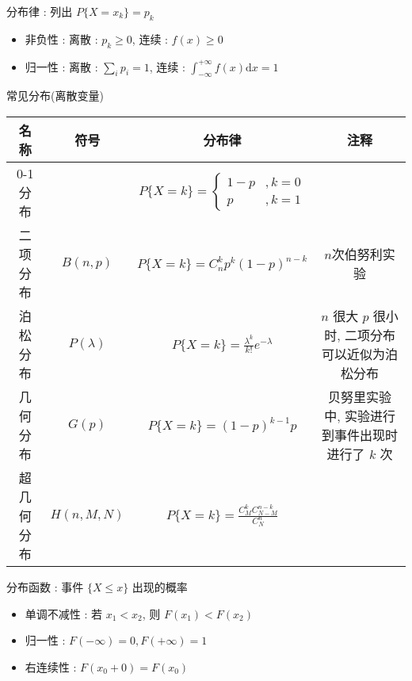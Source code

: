 \documentclass[UTF8, 12pt]{ctexart}
\begin{document}
	分布律 : 列出 $ P\{X = x_{k}\} = p_{k} $
	\begin{itemize}[leftmargin = 4em]
		\item 非负性 : 离散 : $ p_{k} \geq 0 $, 连续 : $ f(x) \geq 0 $
		\item 归一性 : 离散 : $ \sum\limits_{i}p_i = 1 $, 连续 : $ \int_{-\infty}^{+\infty}f(x)\mathrm{d}x = 1 $
	\end{itemize}

	常见分布(离散变量)
	\begin{table}[ht]
		\begin{tabular}{|c|c|c|c|}
			\hline
			名称 & 符号 & 分布律 & 注释 \\ \hline
			0-1分布 & & $ P\{X = k\} = \begin{cases} 1-p&, k=0 \\ p&, k=1 \end{cases} $ & \\ \hline
			二项分布 & $ B(n, p) $ & $ P\{X = k\} = C_{n}^{k}p^{k}(1-p)^{n-k} $ & $ n $次伯努利实验  \\ \hline
			泊松分布 & $ P(\lambda) $ & $ P\{X = k\} = \frac{\lambda^{k}}{k!}e^{-\lambda} $ & $ n $ 很大 $ p $ 很小时, 二项分布可以近似为泊松分布 \\ \hline
			几何分布 & $ G(p) $ & $ P\{X = k\} = (1-p)^{k-1}p $ & 贝努里实验中, 实验进行到事件出现时进行了 $ k $ 次 \\ \hline
			超几何分布 & $ H(n, M, N) $ & $ P\{X = k\} = \frac{C_{M}^{k}C_{N-M}^{n-k}}{C_{N}^{n}} $ & \\ \hline
		\end{tabular}
	\end{table}

	分布函数 : 事件 $ \{X \leq x\} $ 出现的概率
	\begin{itemize}[leftmargin = 4em]
		\item 单调不减性 : 若 $ x_{1} < x_{2} $, 则 $ F(x_{1}) < F(x_{2}) $
		\item 归一性 : $ F(-\infty) = 0, F(+\infty) = 1 $
		\item 右连续性 : $ F(x_{0}+0) = F(x_{0}) $
	\end{itemize}
\end{document}
